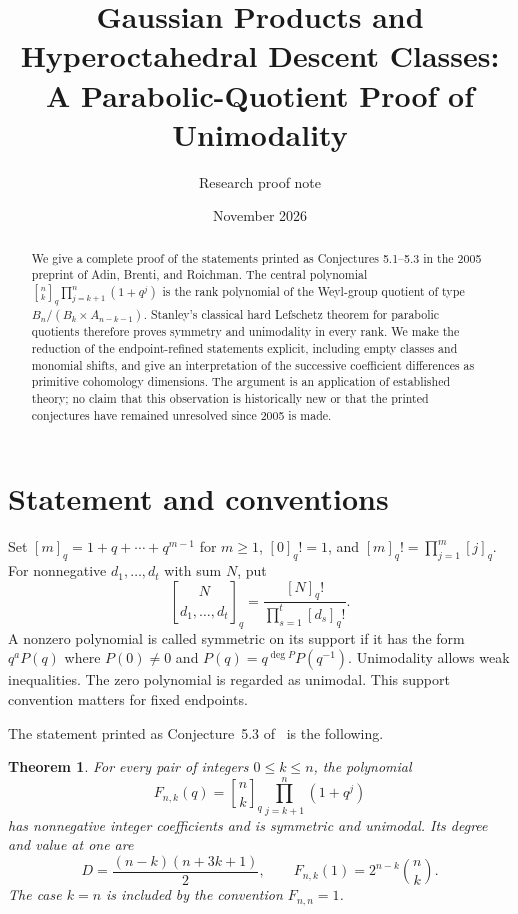 \documentclass[11pt]{article}
\title{Gaussian Products and Hyperoctahedral Descent Classes:\\A Parabolic-Quotient Proof of Unimodality}
\author{Research proof note}
\date{November 2026}
\newtheorem{theorem}{Theorem}
\newcommand{\qbin}[2]{\genfrac{[}{]}{0pt}{}{#1}{#2}_q}
\begin{document}
\maketitle
\begin{abstract}
We give a complete proof of the statements printed as Conjectures 5.1--5.3
in the 2005 preprint of Adin, Brenti, and Roichman. The central polynomial
$\qbin nk\prod_{j=k+1}^n(1+q^j)$ is the rank polynomial of the Weyl-group
quotient of type $B_n/(B_k\times A_{n-k-1})$. Stanley's classical hard
Lefschetz theorem for parabolic quotients therefore proves symmetry and
unimodality in every rank. We make the reduction of the endpoint-refined
statements explicit, including empty classes and monomial shifts, and give
an interpretation of the successive coefficient differences as primitive
cohomology dimensions. The argument is an application of established theory;
no claim that this observation is historically new or that the printed
conjectures have remained unresolved since 2005 is made.
\end{abstract}

\section{Statement and conventions}
Set $[m]_q=1+q+\cdots+q^{m-1}$ for $m\ge1$, $[0]_q!=1$, and
$[m]_q!=\prod_{j=1}^m[j]_q$. For nonnegative $d_1,\ldots,d_t$ with
sum $N$, put
\[
\qbin N{d_1,\ldots,d_t}=\frac{[N]_q!}{\prod_{s=1}^t[d_s]_q!}.
\]
A nonzero polynomial is called symmetric on its support if it has the form
$q^aP(q)$ where $P(0)\ne0$ and $P(q)=q^{\deg P}P(q^{-1})$.
Unimodality allows weak inequalities. The zero polynomial is regarded as
unimodal. This support convention matters for fixed endpoints.

The statement printed as Conjecture~5.3 of~\cite{ABR} is the following.
\begin{theorem}\label{thm:main}
For every pair of integers $0\le k\le n$, the polynomial
\[
F_{n,k}(q)=\qbin nk\prod_{j=k+1}^n(1+q^j)
\]
has nonnegative integer coefficients and is symmetric and unimodal.
Its degree and value at one are
\[
D=\frac{(n-k)(n+3k+1)}2,\qquad F_{n,k}(1)=2^{n-k}\binom nk.
\]
The case $k=n$ is included by the convention $F_{n,n}=1$.
\end{theorem}
\end{document}
